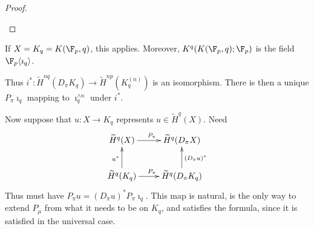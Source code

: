 \documentclass[11pt]{article}
\begin{document}
\begin{SteenrodTalk}
\begin{proof}
\begin{itemize}
\end{itemize}
\end{proof}
\begin{itemise}
\item If $X=K_q=K(\F_p,q)$, this applies. Moreover, $K^q(K(\F_p,q);\F_p)$ is the field $\F_p\langle\imath_q\rangle$.
\item Thus $i^*:\widetilde H^{nq}(D_\pi K_q)\to \widetilde H^{np}(K_q^{(n)})$ is an isomorphism. There is then a unique $P_\pi\imath_q$ mapping to $\imath_q^{\wedge n}$ under $i^*$.
\item Now suppose that $u:X\to K_q$ represents $u\in \widetilde H^q(X)$. Need
\[\xymatrix{
\widetilde H^q(X)\ar[r]^{P_\pi}&\widetilde H^q(D_\pi X)\\
\widetilde H^q(K_q)\ar[r]^{P_\pi}\ar[u]^{u^*}&\widetilde H^q(D_\pi K_q)\ar[u]_{(D_\pi u)^*}
}\]
Thus must have $P_\pi u=(D_\pi u)^*P_\pi\imath_q$. This map is natural, is the only way to extend $P_\mu$ from what it needs to be on $K_q$, and satisfies the formula, since it is satisfied in the universal case.
\end{itemise}

\pagebreak


\end{SteenrodTalk}
\end{document}
